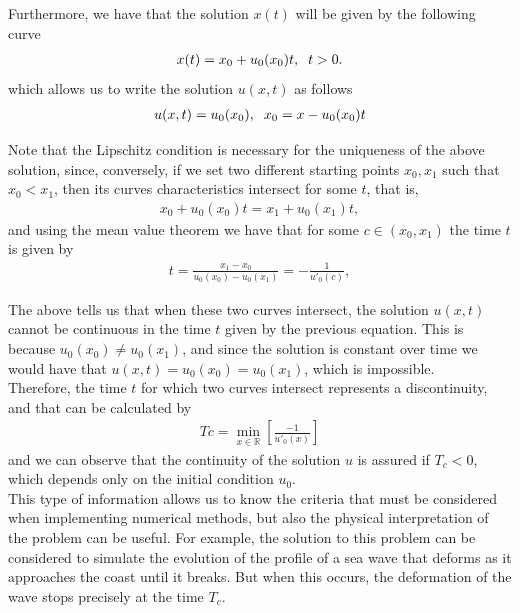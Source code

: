 	Furthermore, we have that the solution $ x (t) $ will be given by the following curve
	\begin{align*}
		x(t) = x_0 + u_0 (x_0) t, \hspace{2mm} t > 0.
	\end{align*}
	which allows us to write the solution $ u(x, t)$ as follows
	\begin{align}
	\label{Exact_Inviscid}	
		u(x, t) = u_0(x_0), \hspace{2mm} x_0 = x - u_0(x_0) t
	\end{align}
	
	Note that the Lipschitz condition is necessary for the uniqueness of the above solution, since, conversely, if we set two different starting points $x_0, x_1$ such that $x_0 <x_1$, then its curves characteristics intersect for some $t$, that is,
	\begin{align*}
		x_0 + u_0(x_0) t = x_1 + u_0 (x_1) t,
	\end{align*}
	and using the mean value theorem we have that for some $c \in (x_0, x_1)$ the time $t$ is given by
	\begin{align*}
		t = \frac{x_1 - x_0}{u_0 (x_0) - u_0 (x_1)} = - \frac{1}{u'_0(c)},
	\end{align*}
	
	The above tells us that when these two curves intersect, the solution $u (x, t)$ cannot be continuous in the time $ t $ given by the previous equation. This is because $u_0 (x_0) \neq u_0 (x_1)$, and since the solution is constant over time we would have that $u (x, t) = u_0 (x_0) = u_0 (x_1)$, which is impossible. \\
		
	Therefore, the time $t$ for which two curves intersect represents a discontinuity, and that can be calculated by
	\begin{align}
	\label{shock_time}	
			Tc = \min_{x \in \mathbb{R}} \left[  \frac{-1}{u'_0 (x)} \right]
	\end{align}
	and we can observe that the continuity of the solution $u$ is assured if $T_c < 0$, which depends only on the initial condition $u_0$. \\
	
	This type of information allows us to know the criteria that must be considered when implementing numerical methods, but also the physical interpretation of the problem can be useful. For example, the solution to this problem can be considered to simulate the evolution of the profile of a sea wave that deforms as it approaches the coast until it breaks. But when this occurs, the deformation of the wave stops precisely at the time $T_c$. \\
	
